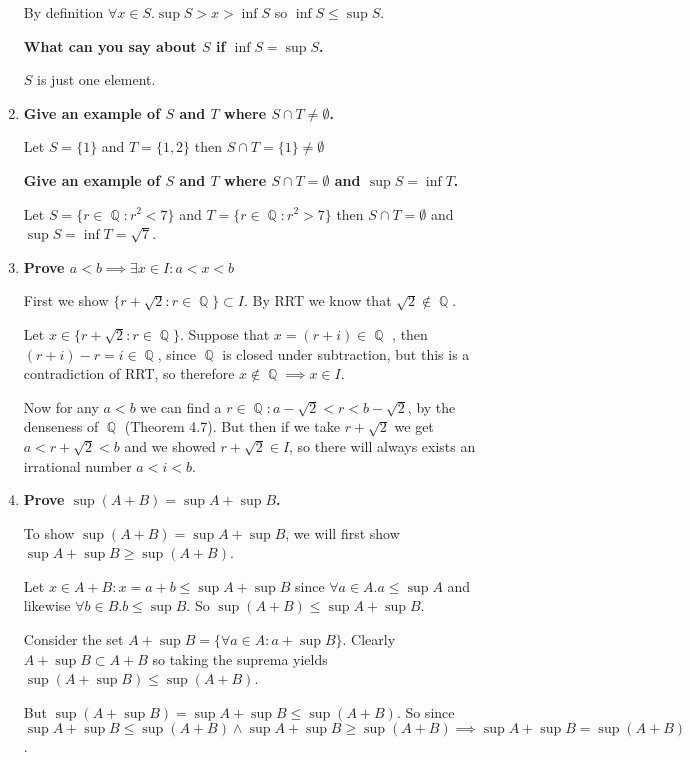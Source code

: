 \documentclass[10pt,a4paper]{article}
\DeclareMathOperator*{\Q}{\mathbb{Q}}
\begin{document}
\begin{enumerate}
        By definition $\forall x \in S. \sup S > x > \inf S$ so $\inf S \leq \sup S$.

        \textbf{What can you say about $S$ if $\inf S = \sup S$.}
        
        $S$ is just one element.

    \item \textbf{Give an example of $S$ and $T$ where $S \cap T \neq \emptyset$.} 
        
        Let $S = \{ 1 \} $ and $T = \{1, 2\}$ then $S \cap T = \{ 1 \} \neq \emptyset$

        \textbf{Give an example of $S$ and $T$ where $S \cap T = \emptyset$ and $\sup S = \inf T$.} 

        Let $S = \{ r \in \Q : r^2 < 7 \} $ and $T = \{ r \in \Q : r^2 > 7 \}$ then $S \cap T = \emptyset$ and $\sup S = \inf T = \sqrt7$.

    \item \textbf{Prove $a<b \implies \exists x \in I: a<x<b$}

        First we show $\{ r + \sqrt2 : r \in \Q\} \subset I$. By RRT we know that $\sqrt2 \not\in \Q$.

        Let $x \in \{ r + \sqrt2 : r \in \Q\}$. Suppose that $x = (r+i) \in \Q$ , then $(r+i) - r = i \in \Q$, since $\Q$ is closed under subtraction, but this is a contradiction of RRT, so therefore $x \not\in \Q \implies x \in I$.

        Now for any $a < b$ we can find a $r \in \Q : a - \sqrt2 < r < b - \sqrt2$, by the denseness of $\Q$ (Theorem 4.7). 
        But then if we take $r + \sqrt2$ we get $a < r+\sqrt2 < b$ and we showed $r+\sqrt2 \in I$, so there will always exists an irrational number $a < i < b$.

    \item \textbf{Prove $\sup(A+B) = \sup A + \sup B $.}

        To show $\sup(A+B) = \sup A + \sup B $, we will first show $\sup A + \sup B \geq\sup(A+B)$.

        Let $x \in A+B : x =a+b  \leq \sup A  + \sup B$ since $\forall a \in A. a \leq \sup A$ and likewise $\forall b \in B. b \leq \sup B$.  So $\sup (A+B) \leq \sup A +  \sup B$.

        Consider the set $A+\sup B = \{\forall a \in A: a+\sup B\}$. Clearly $A + \sup B \subset A+B $ so taking the suprema yields $\sup(A+\sup B)\leq \sup(A+B)$. 

        But $\sup(A + \sup B) = \sup A + \sup B \leq \sup(A+B)$. So since 
        $$\sup A + \sup B \leq \sup(A+B) \land \sup A + \sup B \geq \sup(A+B) \implies \sup A + \sup B = \sup(A+B)$$.


\end{enumerate}
\end{document}
